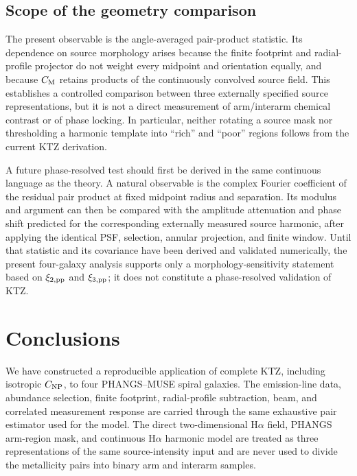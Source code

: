 \documentclass[fleqn,usenatbib]{mnras}
\begin{document}
\subsection{Scope of the geometry comparison}
\label{ssec:geometry_scope}

The present observable is the angle-averaged pair-product statistic.  Its dependence on source morphology arises because the finite footprint and radial-profile projector do not weight every midpoint and orientation equally, and because $C_{\rm M}$ retains products of the continuously convolved source field.  This establishes a controlled comparison between three externally specified source representations, but it is not a direct measurement of arm/interarm chemical contrast or of phase locking.  In particular, neither rotating a source mask nor thresholding a harmonic template into ``rich'' and ``poor'' regions follows from the current KTZ derivation.

A future phase-resolved test should first be derived in the same continuous language as the theory.  A natural observable is the complex Fourier coefficient of the residual pair product at fixed midpoint radius and separation.  Its modulus and argument can then be compared with the amplitude attenuation and phase shift predicted for the corresponding externally measured source harmonic, after applying the identical PSF, selection, annular projection, and finite window.  Until that statistic and its covariance have been derived and validated numerically, the present four-galaxy analysis supports only a morphology-sensitivity statement based on $\xi_{2,{\rm pp}}$ and $\xi_{3,{\rm pp}}$; it does not constitute a phase-resolved validation of KTZ.

\section{Conclusions}

We have constructed a reproducible application of complete KTZ, including isotropic $C_{\rm NP}$, to four PHANGS--MUSE spiral galaxies.  The emission-line data, abundance selection, finite footprint, radial-profile subtraction, beam, and correlated measurement response are carried through the same exhaustive pair estimator used for the model.  The direct two-dimensional H$\alpha$ field, PHANGS arm-region mask, and continuous H$\alpha$ harmonic model are treated as three representations of the same source-intensity input and are never used to divide the metallicity pairs into binary arm and interarm samples.
\end{document}
